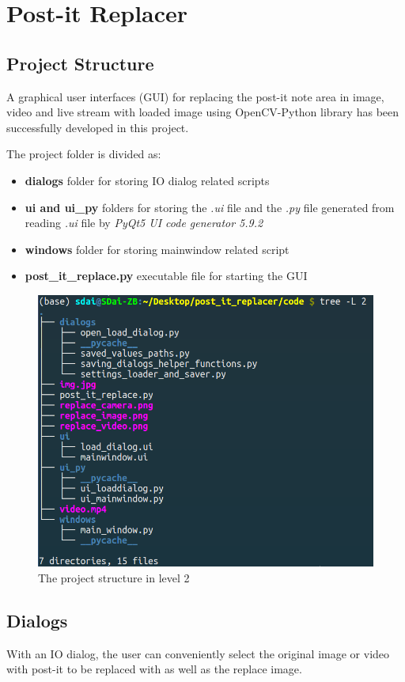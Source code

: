 \documentclass[a4paper, twoside]{report}
\begin{document}
{{\chapter{Post-it Replacer}
\section{Project Structure}

\noindent A graphical user interfaces (GUI) for replacing the post-it note area in image, video and live stream with loaded image using OpenCV-Python library has been successfully developed in this project.    \\ \par

\noindent The project folder is divided as:
\begin{itemize}
\item \textbf{dialogs} folder for storing IO dialog related scripts
\item \textbf{ui and ui{\_}py} folders for storing the \textit{.ui} file and the \textit{.py} file generated from reading \textit{.ui} file by \textit{PyQt5 UI code generator 5.9.2}
\item \textbf{windows} folder for storing mainwindow related script
\item \textbf{post{\_}it{\_}replace.py} executable file for starting the GUI 
\end{itemize}


\begin{figure}[h!]
\centering
\includegraphics[width=.69\textwidth]{structure.png}
\caption{The project structure in level 2}
\end{figure}




\newpage
\section{Dialogs}
\noindent With an IO dialog, the user can conveniently select the original image or video with post-it to be replaced with as well as the replace image.   \\ \par

}}
\end{document}
